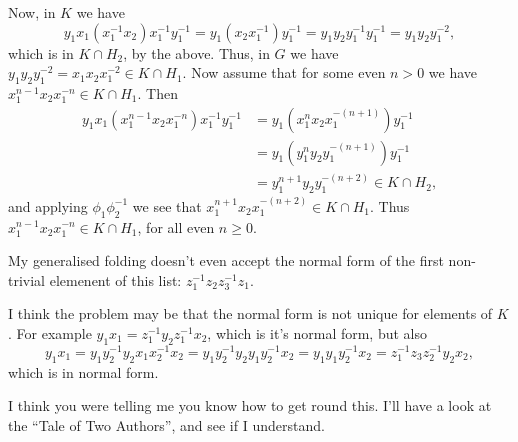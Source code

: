 \documentclass[a4paper,12pt]{article}
\numberwithin{equation}{section}
\numberwithin{figure}{section}
\begin{document}
Now, in $K$ we have
\[
y_1x_1 (x_1^{-1}x_2) x_1^{-1}y_1^{-1}= y_1(x_2x_1^{-1})y_1^{-1}= y_1y_2y_1^{-1}y_1^{-1}=y_1y_2y_1^{-2},
\]
which is in $K\cap H_2$, by the above. Thus, in $G$ we have 
$y_1y_2y_1^{-2}=x_1x_2x_1^{-2}\in K\cap H_1$. Now assume that for some even $n>0$ we have
$x_1^{n-1}x_2x_1^{-n}\in K\cap H_1$. Then   
\begin{align*}
y_1x_1(x_1^{n-1}x_2x_1^{-n})x_1^{-1}y_1^{-1}&=y_1(x_1^nx_2x_1^{-(n+1)})y_1^{-1}\\
&=y_1(y_1^ny_2y_1^{-(n+1)})y_1^{-1}\\
&=y_1^{n+1}y_2y_1^{-(n+2)}\in K\cap H_2,
\end{align*}
and applying $\phi_1\phi_2^{-1}$ we see that $x_1^{n+1}x_2x_1^{-(n+2)}\in K\cap H_1$. 
Thus $x_1^{n-1}x_2x_1^{-n}\in K\cap H_1$, for all even $n\ge 0$. 

My generalised folding doesn't even accept the normal form of the first non-trivial
elemenent of this list: $z_1^{-1}z_2z_3^{-1}z_1$.

I think the problem may be that the normal form is not unique
for elements of $K$. For example
$y_1x_1 = z_1^{-1} y_2 z_1^{-1}x_2$, which is it's normal form, but
also 
\[y_1x_1=y_1y_2^{-1}y_2x_1x_2^{-1}x_2=y_1y_2^{-1}y_2y_1y_2^{-1}x_2=y_1y_1y_2^{-1}x_2=
z_1^{-1}z_3z_2^{-1}y_2x_2,\]
which is in normal form. 

I think you were telling me you know how to get round this. I'll have a
look at the ``Tale of Two Authors'', and see if I understand. 
\end{document}
